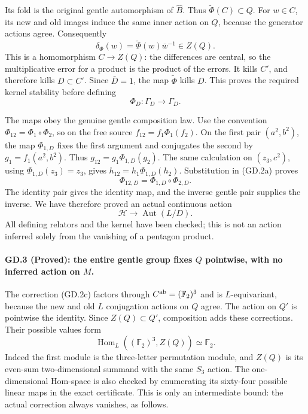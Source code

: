 Its fold is the original gentle automorphism of
$\widehat B$. Thus $\widetilde\Phi(C)\subset Q$.
For $w\in C$, its new and old images induce the
same inner action on $Q$, because the generator
actions agree. Consequently
\[
       \delta_\Phi(w)=\widetilde\Phi(w)\bar w^{-1}\in Z(Q).
 \tag{GD.2c}
\]
This is a homomorphism $C\to Z(Q)$: the differences
are central, so the multiplicative error for a
product is the product of the errors. It kills
$C'$, and therefore kills $D\subset C'$.
Since $\bar D=1$, the map $\widetilde\Phi$
kills $D$. This proves the required kernel
stability before defining
\[
                    \Phi_D:\Gamma_D\longrightarrow\Gamma_D.
\]

The maps obey the genuine gentle composition law.
Use the convention $\Phi_{12}=\Phi_1\circ\Phi_2$,
so on the free source
$f_{12}=f_1\Phi_1(f_2)$. On the first pair
$(a^2,b^2)$, the map $\Phi_{1,D}$ fixes the first
argument and conjugates the second by
$g_1=f_1(a^2,b^2)$. Thus
$g_{12}=g_1\Phi_{1,D}(g_2)$. The same calculation
on $(z_3,c^2)$, using $\Phi_{1,D}(z_3)=z_3$,
gives $h_{12}=h_1\Phi_{1,D}(h_2)$.
Substitution in (GD.2a) proves
\[
              \Phi_{12,D}=\Phi_{1,D}\circ\Phi_{2,D}.
\]
The identity pair gives the identity map, and
the inverse gentle pair supplies the inverse.
We have therefore proved an actual continuous
action
\[
                 \boxed{\ \mathcal H\longrightarrow
                             \operatorname{Aut}(L/D).\ }
 \tag{GD.2d}
\]
All defining relators and the kernel have been
checked; this is not an action inferred solely
from the vanishing of a pentagon product.

\paragraph{GD.3 (Proved): the entire gentle group fixes $Q$ pointwise, with no inferred action on $M$.}
The correction (GD.2c) factors through
$C^{\rm ab}=(\mathbb F_2)^3$ and is $L$-equivariant,
because the new and old $L$ conjugation actions
on $Q$ agree. The action on $Q'$ is pointwise
the identity. Since $Z(Q)\subset Q'$, composition
adds these corrections. Their possible values form
\[
       \operatorname{Hom}_L((\mathbb F_2)^3,Z(Q))
                              \simeq\mathbb F_2.
 \tag{GD.3a}
\]
Indeed the first module is the three-letter
permutation module, and $Z(Q)$ is its even-sum
two-dimensional summand with the same $S_3$ action.
The one-dimensional Hom-space is also checked
by enumerating its sixty-four possible linear
maps in the exact certificate. This is only
an intermediate bound: the actual correction
always vanishes, as follows.

